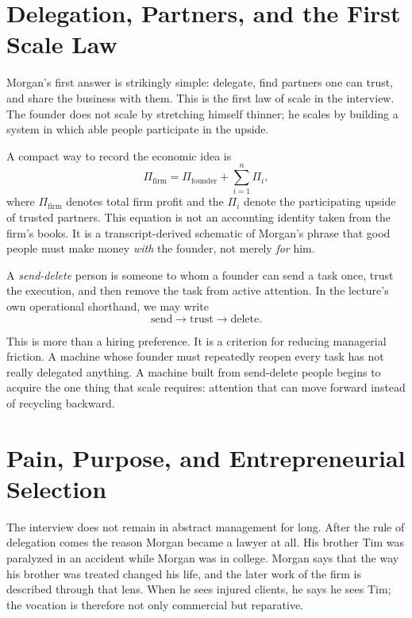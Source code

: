 \section{Delegation, Partners, and the First Scale Law}

Morgan's first answer is strikingly simple: delegate, find partners one can trust, and share the business with them. This is the first law of scale in the interview. The founder does not scale by stretching himself thinner; he scales by building a system in which able people participate in the upside.

A compact way to record the economic idea is
\begin{equation}
\Pi_{\mathrm{firm}} = \Pi_{\mathrm{founder}} + \sum_{i=1}^{n}\Pi_i,
\end{equation}
where \(\Pi_{\mathrm{firm}}\) denotes total firm profit and the \(\Pi_i\) denote the participating upside of trusted partners. This equation is not an accounting identity taken from the firm's books. It is a transcript-derived schematic of Morgan's phrase that good people must make money \emph{with} the founder, not merely \emph{for} him.

\begin{definition}
A \emph{send-delete} person is someone to whom a founder can send a task once, trust the execution, and then remove the task from active attention. In the lecture's own operational shorthand, we may write
\begin{equation}
\text{send} \to \text{trust} \to \text{delete}.
\end{equation}
\end{definition}

This is more than a hiring preference. It is a criterion for reducing managerial friction. A machine whose founder must repeatedly reopen every task has not really delegated anything. A machine built from send-delete people begins to acquire the one thing that scale requires: attention that can move forward instead of recycling backward.

\section{Pain, Purpose, and Entrepreneurial Selection}

The interview does not remain in abstract management for long. After the rule of delegation comes the reason Morgan became a lawyer at all. His brother Tim was paralyzed in an accident while Morgan was in college. Morgan says that the way his brother was treated changed his life, and the later work of the firm is described through that lens. When he sees injured clients, he says he sees Tim; the vocation is therefore not only commercial but reparative.

